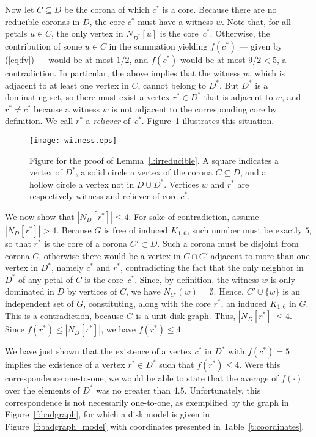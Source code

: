 \documentclass[preprint,12pt]{elsarticle}
\begin{document}
\begin{pf}
Now let $C \subseteq D$ be the corona of which $c^*$ is a core. Because there are no reducible coronas in $D$, the core $c^*$ must have a witness $w$.
Note that, for all petals $u \in C$, the only vertex in $N_{D^*}[u]$ is the core~$c^*$. Otherwise, the contribution of some $u \in C$ in the summation yielding $f(c^*)$ --- given by (\ref{eq:fv}) --- would be at most $1/2$, and $f(c^*)$ would be at most $9/2 < 5$, a contradiction. In particular, the above implies that the witness $w$, which is adjacent to at least one vertex in $C$, cannot belong to $D^*$. But $D^*$ is a dominating set, so there must exist a vertex $r^* \in D^*$ that is adjacent \linebreak to $w$, and $r^* \neq c^*$ because a witness $w$ is not adjacent to the corresponding core by definition. We call $r^*$ a \emph{reliever} of~$c^*$. Figure~\ref{f:witness} illustrates this situation.

\begin{figure}
 \centering
 \texttt{[image: witness.eps]}
 \caption{\label{f:witness} Figure for the proof of Lemma~\ref{l:irreducible}. A square indicates a vertex of $D^*$, a solid circle a vertex of the corona $C \subseteq D$, and a hollow circle a vertex not in $D \cup D^*$. Vertices $w$ and $r^*$ are respectively witness and reliever of core $c^*$.}
\end{figure}

We now show that $|N_D[r^*]| \leq 4$. For sake of contradiction, assume \linebreak $|N_D[r^*]| > 4$. Because $G$ is free of induced $K_{1,6}$, such number must be \linebreak exactly $5$, so that $r^*$ is the core of a corona $C' \subset D$. Such a corona must be disjoint from corona $C$, otherwise there would be a vertex in \mbox{$C \cap C'$} adjacent to more than one vertex in $D^*$, namely $c^*$ and $r^*$, contradicting the fact that the only neighbor in $D^*$ of any petal of $C$ is the core~$c^*$. Since, by definition, the witness $w$ is only dominated in $D$ by vertices of $C$, we have $N_{C'}(w) = \emptyset$. Hence, $C' \cup \{w\}$ is an independent set of $G$, constituting, along with the core $r^*$, an induced $K_{1,6}$ in $G$. This is a contradiction, because $G$ is a unit disk graph. Thus, $|N_D[r^*]| \leq 4$. Since $f(r^*) \leq |N_D[r^*]|$, we have $f(r^*) \leq 4$.

We have just shown that the existence of a vertex $c^*$ in $D^*$ with \mbox{$f(c^*) = 5$} implies the existence of a vertex $r^* \in D^*$ such that $f(r^*) \leq 4$. Were this correspondence one-to-one, we would be able to state that the average \linebreak of $f(\cdot)$ over the elements of $D^*$ was no greater than $4{.}5$. Unfortunately, this correspondence is not necessarily one-to-one, as exemplified by the graph in Figure~\ref{f:badgraph}, for which a disk model is given in Figure~\ref{f:badgraph_model} with coordinates presented in Table~\ref{t:coordinates}.


\end{pf}
\end{document}
